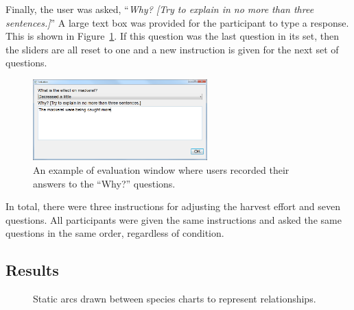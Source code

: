 Finally, the user was asked, ``\textit{Why? [Try to explain in no more than three sentences.]}''  A large text box was provided for the participant to type a response.  This is shown in Figure~\ref{fig:eval_why}. If this question was the last question in its set, then the sliders are all reset to one and a new instruction is given for the next set of questions. 

\begin{figure}[h]
	\centering
	\includegraphics[width=0.6\textwidth]{figures/png/eval_why.png}
	\caption{An example of evaluation window where users recorded their answers to the ``Why?'' questions.}
	\label{fig:eval_why}
\end{figure}

In total, there were three instructions for adjusting the harvest effort and seven questions.  All participants were given the same instructions and asked the same questions in the same order, regardless of condition.

\subsection{Results}

\begin{figure}
\centering


	\caption{Static arcs drawn between species charts to represent relationships.}
	\label{fig:results}
\end{figure}

